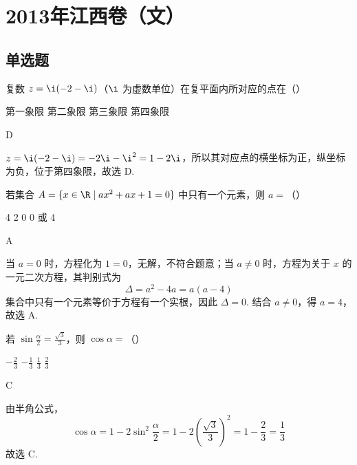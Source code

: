 \chapter{2013年江西卷（文）}

\section{单选题}

\begin{problem}
复数 \(z = \i(-2 - \i)\)（\(\i\) 为虚数单位）在复平面内所对应的点在（\quad）

\choices
    {第一象限}
    {第二象限}
    {第三象限}
    {第四象限}
\end{problem}

\begin{answer}
D
\end{answer}

\begin{solution}
\(z=\i(-2-\i)=-2\i-\i^{2}=1-2\i\)，所以其对应点的横坐标为正，纵坐标为负，位于第四象限，故选 D.
\end{solution}

\begin{problem}
若集合 \(A = \{x \in \R \mid ax^2 + ax + 1 = 0\}\) 中只有一个元素，则 \(a =\)（\quad）

\choices
    {4}
    {2}
    {0}
    {0 或 4}
\end{problem}

\begin{answer}
A
\end{answer}

\begin{solution}
当 \(a=0\) 时，方程化为 \(1=0\)，无解，不符合题意；当 \(a\ne0\) 时，方程为关于 \(x\) 的一元二次方程，其判别式为
\[
\Delta=a^{2}-4a=a(a-4)
\]
集合中只有一个元素等价于方程有一个实根，因此 \(\Delta=0\). 结合 \(a\ne0\)，得 \(a=4\)，故选 A.
\end{solution}

\begin{problem}
若 \(\sin \frac{\alpha}{2} = \frac{\sqrt{3}}{3}\)，则 \(\cos \alpha =\)（\quad）

\choices
    {\(-\frac{2}{3}\)}
    {\(-\frac{1}{3}\)}
    {\( \frac{1}{3} \)}
    {\( \frac{2}{3} \)}
\end{problem}

\begin{answer}
C
\end{answer}

\begin{solution}
由半角公式，
\[
\cos\alpha=1-2\sin^{2}\frac{\alpha}{2}
 =1-2\left(\frac{\sqrt{3}}{3}\right)^{2}
 =1-\frac{2}{3}=\frac{1}{3}
\]
故选 C.
\end{solution}


